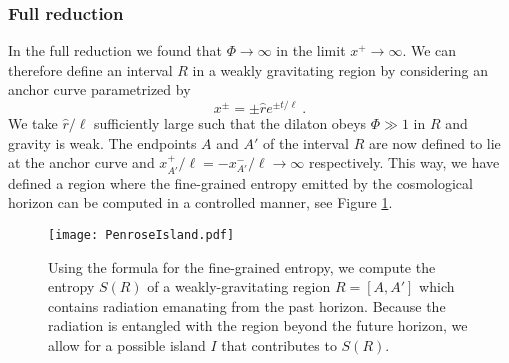 \documentclass[a4paper,11pt]{article}
\newcommand{\beq}{\begin{equation}}
\newcommand{\eeq}{\end{equation}}
\numberwithin{equation}{section}
\begin{document}
\subsubsection*{Full reduction}
%
In the full reduction we found that $\Phi\to\infty$ in the limit $x^+\to\infty$. We can therefore define an interval $R$ in a weakly gravitating region by considering an anchor curve parametrized by
\beq
x^\pm = \pm \hat r e^{\pm t/\ell} ~.
\eeq
We take $\hat r/\ell$ sufficiently large such that the dilaton obeys $\Phi\gg 1$ in $R$ and gravity is weak. The endpoints $A$ and $A'$ of the interval $R$ are now defined to lie at the anchor curve and $x_{A'}^+/\ell=-x_{A'}^-/\ell\to\infty$ respectively. This way, we have defined a region where the fine-grained entropy emitted by the cosmological horizon can be computed in a controlled manner, see Figure \ref{fig:PenroseIsland}.
%
\begin{figure}[h]
\centering
\texttt{[image: PenroseIsland.pdf]}
\caption{Using the formula for the fine-grained entropy, we compute the entropy $S(R)$ of a weakly-gravitating region $R=[A,A']$ which contains radiation emanating from the past horizon. Because the radiation is entangled with the region beyond the future horizon, we allow for a possible island $I$ that contributes to $S(R)$.}
\label{fig:PenroseIsland}
\end{figure}
%
\end{document}
